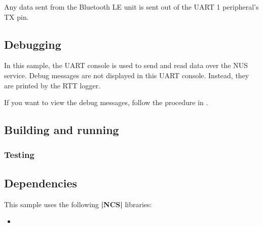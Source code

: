 \documentclass[letterpaper,10pt,english]{sphinxmanual}
\begin{document}
Any data sent from the Bluetooth LE unit is sent out of the UART 1 peripheral’s TX pin.


\subsection{Debugging}
\label{\detokenize{samples/peripheral_uart/README:debugging}}\label{\detokenize{samples/peripheral_uart/README:peripheral-uart-debug}}
In this sample, the UART console is used to send and read data over the NUS service.
Debug messages are not displayed in this UART console.
Instead, they are printed by the RTT logger.

If you want to view the debug messages, follow the procedure in .


\subsection{Building and running}
\label{\detokenize{samples/peripheral_uart/README:building-and-running}}

\subsubsection{Testing}
\label{\detokenize{samples/peripheral_uart/README:testing}}\label{\detokenize{samples/peripheral_uart/README:peripheral-uart-testing}}

\subsection{Dependencies}
\label{\detokenize{samples/peripheral_uart/README:dependencies}}
This sample uses the following {\color{red}\bfseries{}|NCS|} libraries:
\begin{itemize}
\item {} 

\end{itemize}
\end{document}
